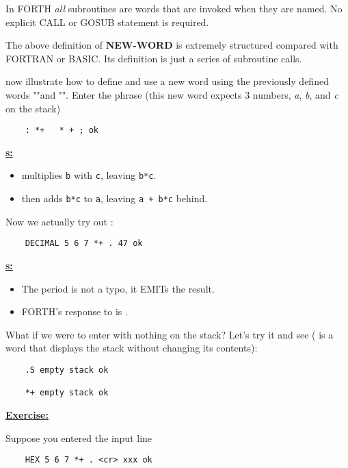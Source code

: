 In FORTH \textit{all} subroutines are words that are invoked when they are named. No explicit CALL or GOSUB statement is required.

The above definition of \textbf{NEW-WORD} is extremely structured compared with FORTRAN or BASIC. Its definition is just a series of subroutine calls.

 now illustrate how to define and use a new word using the previously defined words "\bc{:}"and "\bc{;}". Enter the phrase (this new word \bc{*+} expects 3 numbers, \textit{a}, \textit{b}, and \textit{c} on the stack)

\begin{lstlisting}
    : *+   * + ; ok
\end{lstlisting}

\Note \underline{\textbf{s:}}
\begin{itemize}
    \item \bc{*} multiplies \verb|b| with \verb|c|, leaving \verb|b*c|.
    \item \bc{+} then adds \verb|b*c| to \verb|a|, leaving \verb|a + b*c| behind.
\end{itemize}

Now we actually try out \bc{*+} :

\begin{lstlisting}
    DECIMAL 5 6 7 *+ . 47 ok
\end{lstlisting}

\Note \underline{\textbf{s:}}
\begin{itemize}
    \item The period  is not a typo, it EMITs the result.
    \item FORTH's response to  is .
\end{itemize}

What if we were to enter \bc{*+} with nothing on the stack? Let's try it and see ( is a word that displays the stack without changing its contents):

\begin{lstlisting}
    .S empty stack ok

    *+ empty stack ok
\end{lstlisting}


\underline{\textbf{Exercise:}}

Suppose you entered the input line

\begin{lstlisting}
    HEX 5 6 7 *+ . <cr> xxx ok
\end{lstlisting}


